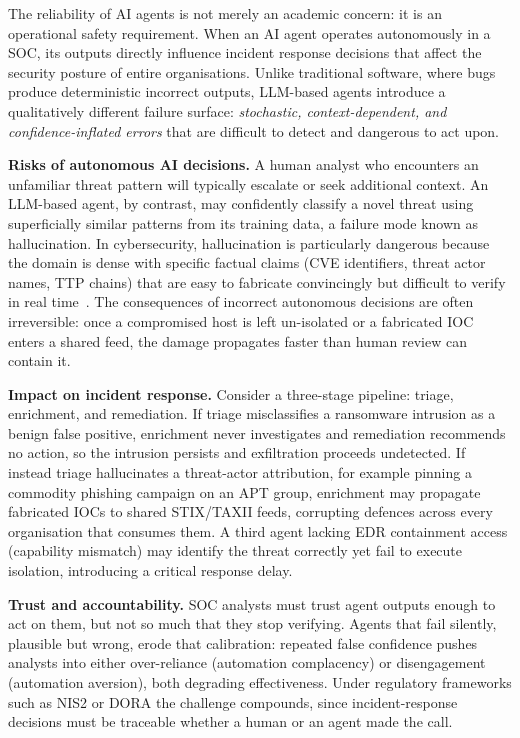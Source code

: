 \documentclass[journal,compsoc]{IEEEtran}
\begin{document}
The reliability of AI agents is not merely an academic concern: it is an
operational safety requirement. When an AI agent operates autonomously in a
SOC, its outputs directly influence incident response decisions that affect
the security posture of entire organisations. Unlike traditional software,
where bugs produce deterministic incorrect outputs, LLM-based agents
introduce a qualitatively different failure surface: \textit{stochastic,
context-dependent, and confidence-inflated errors} that are difficult to
detect and dangerous to act upon.

\textbf{Risks of autonomous AI decisions.}
A human analyst who encounters an unfamiliar threat pattern will typically
escalate or seek additional context. An LLM-based agent, by contrast, may
confidently classify a novel threat using superficially similar patterns from
its training data, a failure mode known as hallucination. In cybersecurity,
hallucination is particularly dangerous because the domain is dense with
specific factual claims (CVE identifiers, threat actor names, TTP chains)
that are easy to fabricate convincingly but difficult to verify in
real time~\cite{llmagent_halluc_survey2025}. The consequences of
incorrect autonomous decisions are often irreversible: once a compromised
host is left un-isolated or a fabricated IOC enters a shared feed, the damage
propagates faster than human review can contain it.

\textbf{Impact on incident response.}
Consider a three-stage pipeline: triage, enrichment, and remediation.
If triage misclassifies a ransomware intrusion as a benign false
positive, enrichment never investigates and remediation recommends no
action, so the intrusion persists and exfiltration proceeds undetected.
If instead triage hallucinates a threat-actor attribution, for example
pinning a commodity phishing campaign on an APT group, enrichment may
propagate fabricated IOCs to shared STIX/TAXII feeds, corrupting
defences across every organisation that consumes them. A third agent
lacking EDR containment access (capability mismatch) may identify the
threat correctly yet fail to execute isolation, introducing a critical
response delay.

\textbf{Trust and accountability.}
SOC analysts must trust agent outputs enough to act on them, but not so
much that they stop verifying. Agents that fail silently, plausible but
wrong, erode that calibration: repeated false confidence pushes analysts
into either over-reliance (automation complacency) or disengagement
(automation aversion), both degrading effectiveness. Under regulatory
frameworks such as NIS2 or DORA the challenge compounds, since
incident-response decisions must be traceable whether a human or an agent
made the call.
\end{document}
